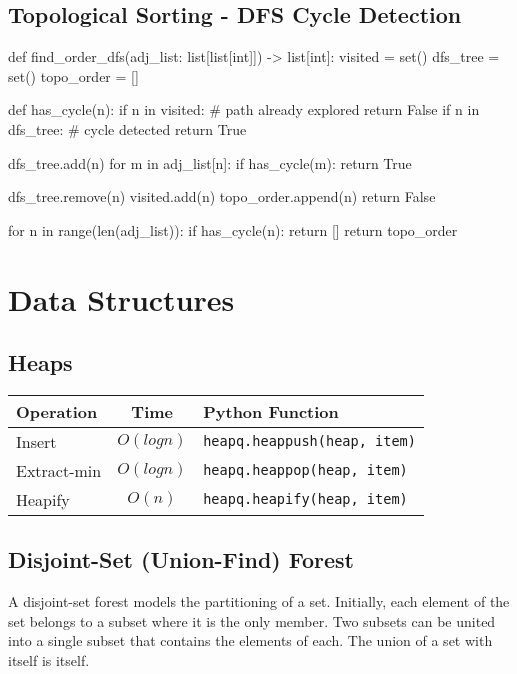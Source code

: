 \documentclass[12pt, titlepage]{article}
\begin{document}
\subsection{Topological Sorting - DFS Cycle Detection}
\begin{python}
def find_order_dfs(adj_list: list[list[int]]) -> list[int]:
    visited = set()
    dfs_tree = set()
    topo_order = []

    def has_cycle(n):
        if n in visited:  # path already explored
            return False
        if n in dfs_tree:  # cycle detected
            return True

        dfs_tree.add(n)
        for m in adj_list[n]:
            if has_cycle(m):
                return True

        dfs_tree.remove(n)
        visited.add(n)
        topo_order.append(n)
        return False

    for n in range(len(adj_list)):
        if has_cycle(n):
            return []
    return topo_order
\end{python}

\section{Data Structures}

\subsection{Heaps}
\begin{center}
\begin{tabular}{|l|c|l|}
  \hline
  \textbf{Operation} & \textbf{Time} & \textbf{Python Function} \\
  \hline
  Insert & $O(logn)$ & \texttt{heapq.heappush(heap, item)} \\
  Extract-min & $O(logn)$ & \texttt{heapq.heappop(heap, item)} \\
  Heapify & $O(n)$ & \texttt{heapq.heapify(heap, item)} \\
  \hline
\end{tabular}
\end{center}

\subsection{Disjoint-Set (Union-Find) Forest}
A disjoint-set forest models the partitioning of a set. Initially, each element of the set belongs to a subset where it is the only member. Two subsets can be united into a single subset that contains the elements of each. The union of a set with itself is itself. \\
\end{document}
